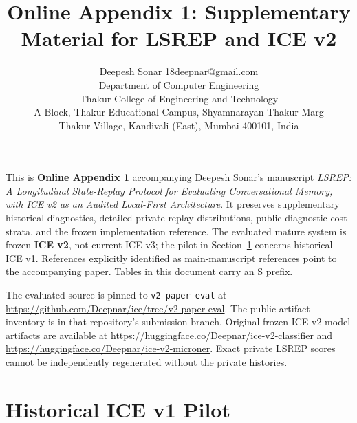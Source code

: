 \documentclass[twoside,11pt]{article}
\title{Online Appendix 1: Supplementary Material for LSREP and ICE v2}
\author{\name Deepesh Sonar \email 18deepnar@gmail.com \\
  \addr Department of Computer Engineering\\
  Thakur College of Engineering and Technology\\
  A-Block, Thakur Educational Campus, Shyamnarayan Thakur Marg\\
  Thakur Village, Kandivali (East), Mumbai 400101, India}
\begin{document}
\maketitle
\thispagestyle{plain}

This is \textbf{Online Appendix 1} accompanying Deepesh Sonar's manuscript
\emph{LSREP: A Longitudinal State-Replay Protocol for Evaluating Conversational Memory, with ICE v2 as an Audited Local-First Architecture}.
It preserves supplementary historical diagnostics, detailed private-replay distributions,
public-diagnostic cost strata, and the frozen implementation reference. The evaluated mature system is frozen \textbf{ICE v2},
not current ICE v3; the pilot in Section~\ref{app:exp1} concerns historical ICE v1.
References explicitly identified as main-manuscript references point to the accompanying paper.
Tables in this document carry an S prefix.

The evaluated source is pinned to \texttt{v2-paper-eval} at
\url{https://github.com/Deepnar/ice/tree/v2-paper-eval}.
The public artifact inventory is  in that repository's
submission branch. Original frozen ICE v2 model artifacts are available at
\url{https://huggingface.co/Deepnar/ice-v2-classifier} and
\url{https://huggingface.co/Deepnar/ice-v2-microner}.
Exact private LSREP scores cannot be independently regenerated without the private histories.

\renewcommand{\thetable}{S\arabic{table}}
\renewcommand{\thefigure}{S\arabic{figure}}

\section{Historical ICE v1 Pilot}
\label{app:exp1}
\end{document}
